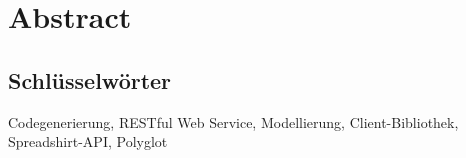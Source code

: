 \chapter*{Abstract}



\section*{Schlüsselwörter}

Codegenerierung, RESTful Web Service, Modellierung, Client-Bibliothek, Spreadshirt-API, Polyglot
\newpage